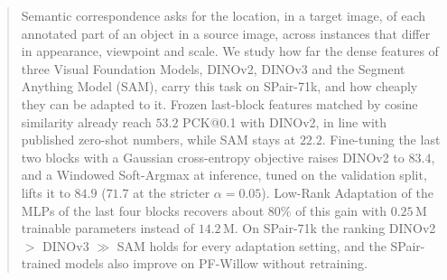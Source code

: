 \begin{abstract}
Semantic correspondence asks for the location, in a target image, of each annotated part of an object in a source image, across instances that differ in appearance, viewpoint and scale. We study how far the dense features of three Visual Foundation Models, DINOv2, DINOv3 and the Segment Anything Model (SAM), carry this task on SPair-71k, and how cheaply they can be adapted to it. Frozen last-block features matched by cosine similarity already reach $53.2$ PCK@0.1 with DINOv2, in line with published zero-shot numbers, while SAM stays at $22.2$. Fine-tuning the last two blocks with a Gaussian cross-entropy objective raises DINOv2 to $83.4$, and a Windowed Soft-Argmax at inference, tuned on the validation split, lifts it to $84.9$ ($71.7$ at the stricter $\alpha{=}0.05$). Low-Rank Adaptation of the MLPs of the last four blocks recovers about $80\%$ of this gain with $0.25$\,M trainable parameters instead of $14.2$\,M. On SPair-71k the ranking DINOv2 $>$ DINOv3 $\gg$ SAM holds for every adaptation setting, and the SPair-trained models also improve on PF-Willow without retraining.
\end{abstract}
